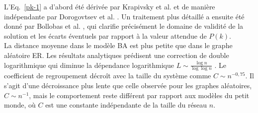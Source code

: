 L'Eq.~\eqref{pk-1} a d'abord été dérivée par Krapivsky et al. \cite{Krapivsky-al2000} et de manière indépendante par Dorogovtsev et al. \cite{Dorogovtsev-al2000-2}. Un traitement plus détaillé a ensuite été donné par Bollobas et al. \cite{Bollobas-Riordan2002}, qui clarifie précisément le domaine de validité de la solution et les écarts éventuels par rapport à la valeur attendue de  $P(k)$.\\ 
La distance moyenne dans le modèle BA est plus petite que dans le graphe aléatoire ER. Les résultats analytiques prédisent une correction de double logarithmique qui diminue la dépendance logarithmique $ L\sim\frac{\log n}{\log\log n }$ \cite{Bollobas-Riordan2002}. Le coefficient de regroupement décroît avec la taille du système comme $C\sim n^{-0,75}$. Il s'agit d'une décroissance plus lente que celle observée pour les graphes aléatoires, $C\sim n^{-1}$, mais le comportement reste différent par rapport aux modèles du petit monde, où $C$ est une constante indépendante de la taille du réseau $n$.
